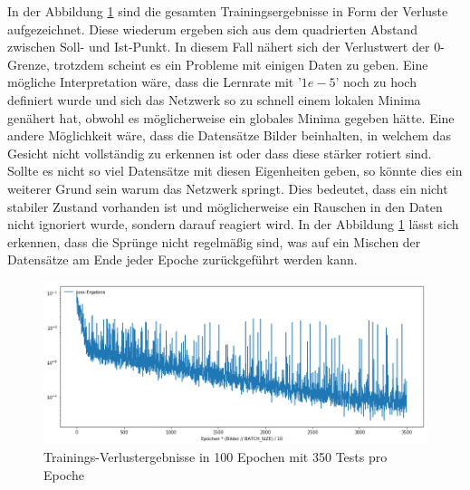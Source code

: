 In der Abbildung \ref{fig:lossDiag} sind die gesamten Trainingsergebnisse in Form der Verluste aufgezeichnet. 
Diese wiederum ergeben sich aus dem quadrierten Abstand zwischen Soll- und Ist-Punkt.
In diesem Fall nähert sich der Verlustwert der $0$-Grenze, trotzdem scheint es ein Probleme mit einigen Daten zu geben. 
Eine mögliche Interpretation wäre, dass die Lernrate mit '$1e-5$' noch zu hoch definiert wurde und sich das Netzwerk so zu schnell einem lokalen Minima genähert hat, obwohl es möglicherweise ein globales Minima gegeben hätte. 
Eine andere Möglichkeit wäre, dass die Datensätze Bilder beinhalten, in welchem das Gesicht nicht vollständig zu erkennen ist oder dass diese stärker rotiert sind. 
Sollte es nicht so viel Datensätze mit diesen Eigenheiten geben, so könnte dies ein weiterer Grund sein warum das Netzwerk springt. 
Dies bedeutet, dass ein nicht stabiler Zustand vorhanden ist und möglicherweise ein Rauschen in den Daten nicht ignoriert wurde, sondern darauf reagiert wird.
In der Abbildung \ref{fig:lossDiag} lässt sich erkennen, dass die Sprünge nicht regelmäßig sind, was auf ein Mischen der Datensätze am Ende jeder Epoche zurückgeführt werden kann. 
\begin{figure}[ht!]
	\centering
	\includegraphics[scale=0.4]{images/loss-diagram-all-new.png}
	\caption{Trainings-Verlustergebnisse in 100 Epochen mit 350 Tests pro Epoche}
	\label{fig:lossDiag}
\end{figure} \phantom \newline

